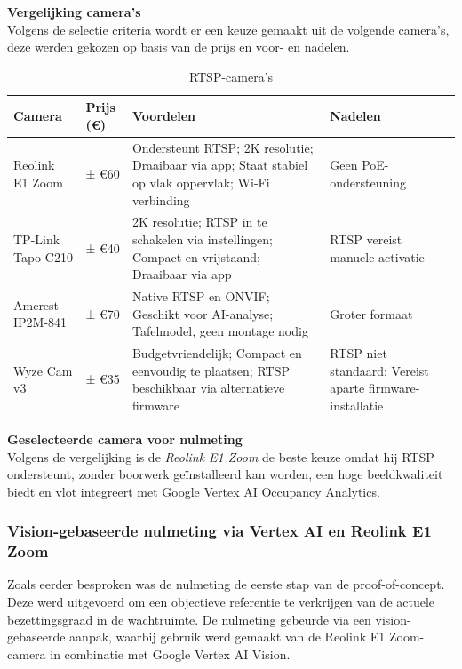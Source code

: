 \textbf{Vergelijking camera's} \\
Volgens de selectie criteria wordt er een keuze gemaakt uit de volgende camera's, deze werden gekozen op basis van de prijs en voor- en nadelen.
\begin{table}[h!]
    \centering
    \caption{RTSP-camera's}
    \begin{tabular}{|p{3.5cm}|p{1.8cm}|p{6cm}|p{3cm}|}
        \hline
        \textbf{Camera} & \textbf{Prijs (€)} & \textbf{Voordelen} & \textbf{Nadelen} \\
        \hline
        Reolink E1 Zoom & ± €60 & Ondersteunt RTSP; 2K resolutie; Draaibaar via app; Staat stabiel op vlak oppervlak; Wi-Fi verbinding & Geen PoE-ondersteuning \\
        \hline
        TP-Link Tapo C210 & ± €40 & 2K resolutie; RTSP in te schakelen via instellingen; Compact en vrijstaand; Draaibaar via app & RTSP vereist manuele activatie \\
        \hline
        Amcrest IP2M-841 & ± €70 & Native RTSP en ONVIF; Geschikt voor AI-analyse; Tafelmodel, geen montage nodig & Groter formaat \\
        \hline
        Wyze Cam v3 & ± €35 & Budgetvriendelijk; Compact en eenvoudig te plaatsen; RTSP beschikbaar via alternatieve firmware & RTSP niet standaard; Vereist aparte firmware-installatie \\
        \hline
    \end{tabular}
    \label{tab:rtsp-cams}
\end{table}


\textbf{Geselecteerde camera voor nulmeting} \\
Volgens de vergelijking is de \textit{Reolink E1 Zoom} de beste keuze omdat hij RTSP ondersteunt, zonder boorwerk geïnstalleerd kan worden, een hoge beeldkwaliteit biedt en vlot integreert met Google Vertex AI Occupancy Analytics.

\subsubsection{Vision-gebaseerde nulmeting via Vertex AI en Reolink E1 Zoom}
Zoals eerder besproken was de nulmeting de eerste stap van de proof-of-concept. Deze werd uitgevoerd om een objectieve referentie te verkrijgen van de actuele bezettingsgraad in de wachtruimte. De nulmeting gebeurde via een vision-gebaseerde aanpak, waarbij gebruik werd gemaakt van de Reolink E1 Zoom-camera in combinatie met Google Vertex AI Vision. \\

